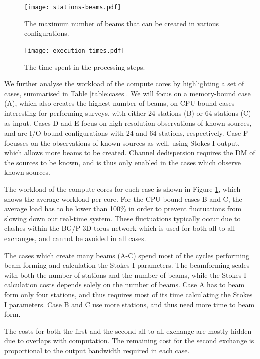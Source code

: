 \documentclass{llncs}
\begin{document}
\begin{figure}[ht]
\begin{minipage}[t]{0.47\textwidth}
\texttt{[image: stations-beams.pdf]}
\label{fig:stations-beams}
\caption{The maximum number of beams that can be created in various configurations.}
\end{minipage}
\hfill
\begin{minipage}[t]{0.47\textwidth}
\texttt{[image: execution\_times.pdf]}
\label{fig:execution-times}
\caption{The time spent in the processing steps.}
\end{minipage}
\end{figure}

We further analyse the workload of the compute cores by highlighting a set of cases, summarised in Table \ref{table:cases}. We will focus on a memory-bound case (A), which also creates the highest number of beams, on CPU-bound cases interesting for performing surveys, with either 24 stations (B) or 64 stations (C) as input. Cases D and E focus on high-resolution observations of known sources, and are I/O bound configurations with 24 and 64 stations, respectively. Case F focusses on the observations of known sources as well, using Stokes I output, which allows more beams to be created. Channel dedispersion requires the DM of the sources to be known, and is thus only enabled in the cases which observe known sources.

The workload of the compute cores for each case is shown in Figure \ref{fig:execution-times}, which shows the average workload per core. For the CPU-bound cases B and C, the average load has to be lower than 100\% in order to prevent fluctuations from slowing down our real-time system. These fluctuations typically occur due to clashes within the BG/P 3D-torus network which is used for both all-to-all-exchanges, and cannot be avoided in all cases.

The cases which create many beams (A-C) spend most of the cycles performing beam forming and calculation the Stokes I parameters. The beamforming scales with both the number of stations and the number of beams, while the Stokes I calculation costs depends solely on the number of beams. Case A has to beam form only four stations, and thus requires most of its time calculating the Stokes I parameters. Case B and C use more stations, and thus need more time to beam form.

The costs for both the first and the second all-to-all exchange are mostly hidden due to overlaps with computation. The remaining cost for the second exchange is proportional to the output bandwidth required in each case.
\end{document}
